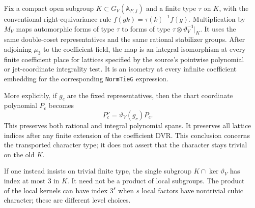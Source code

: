 \begin{proposition}
\label{AC-G42-lattice}
Fix a compact open subgroup $K\subset G_V(\mathbb A_{F,f})$
and a finite type $\tau$ on $K$, with the conventional
right-equivariance rule $f(gk)=\tau(k)^{-1}f(g)$.
Multiplication by $M_V$
maps automorphic forms of type $\tau$ to forms of type
$\tau\otimes\vartheta_V^{-1}|_K$.  It uses the same double-coset
representatives and the same rational stabilizer groups.
After adjoining $\mu_3$ to the coefficient field, the map
is an integral isomorphism at every finite coefficient
place for lattices specified by the source's pointwise
polynomial or jet-coordinate integrality test.  It is
an isometry at every infinite coefficient embedding
for the corresponding \texttt{NormTieG} expression.

More explicitly, if $g_c$ are the fixed representatives,
then the chart coordinate polynomial $P_c$ becomes
\[
                  P_c^{\nu}=\vartheta_V(g_c)P_c.         \tag{G42.5}
\]
This preserves both rational and integral polynomial
spans.  It preserves all lattice indices after any
finite extension of the coefficient DVR.  This
conclusion concerns the transported character type;
it does not assert that the character stays trivial
on the old $K$.

If one instead insists on trivial finite type, the
single subgroup $K\cap\ker\vartheta_V$ has index at
most $3$ in $K$.  It need not be a product of local
subgroups.  The product of the local kernels can have
index $3^s$ when $s$ local factors have nontrivial cubic
character; these are different level choices.
\end{proposition}

